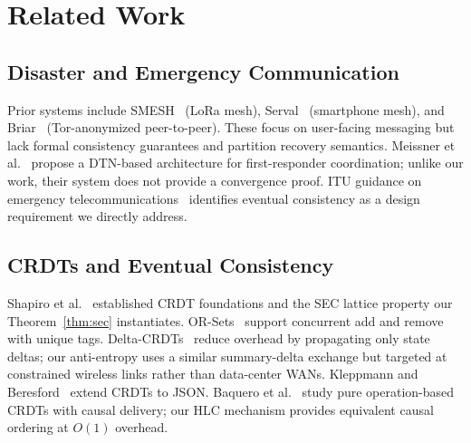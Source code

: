 \documentclass[conference]{IEEEtran}
\begin{document}
\section{Related Work}
\label{sec:related}

\subsection{Disaster and Emergency Communication}
Prior systems include SMESH~\cite{foo_smesh_2010} (LoRa mesh),
Serval~\cite{gardner_serval_2013} (smartphone mesh), and
Briar~\cite{briar_2019} (Tor-anonymized peer-to-peer).  These focus on
user-facing messaging but lack formal consistency guarantees and partition
recovery semantics.  Meissner et al.~\cite{meissner_dtn_rescue_2012} propose
a DTN-based architecture for first-responder coordination; unlike our work,
their system does not provide a convergence proof.  ITU guidance on emergency
telecommunications~\cite{itu_disaster_2022} identifies eventual consistency
as a design requirement we directly address.

\subsection{CRDTs and Eventual Consistency}
Shapiro et al.~\cite{shapiro_crdt_2011,shapiro_crdt_tech_2011} established
CRDT foundations and the SEC lattice property our Theorem~\ref{thm:sec} instantiates.
OR-Sets~\cite{bieniusa_or_2012} support concurrent add and remove with unique tags.
Delta-CRDTs~\cite{almeida_delta_2018} reduce overhead by propagating only state
deltas; our anti-entropy uses a similar summary-delta exchange but targeted at
constrained wireless links rather than data-center WANs.
Kleppmann and Beresford~\cite{kleppmann_byzantine_crdt_2017} extend CRDTs to JSON.
Baquero et al.~\cite{baquero_pure_op_2017} study pure operation-based CRDTs with
causal delivery; our HLC mechanism provides equivalent causal ordering at $O(1)$ overhead.
\end{document}
